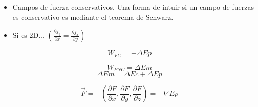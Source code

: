     \begin{itemize}
        \item Campos de fuerza conservativos. Una forma de intuir si un campo de fuerzas es conservativo es mediante el teorema de Schwarz. 
        \item Si es 2D... $\left( \frac{\partial f_y}{\partial x} = \frac{\partial f_x}{\partial y} \right)$
    \end{itemize}
    \begin{equation}
        W_{FC} = -\Delta Ep
    \end{equation}

    \begin{equation}
        W_{FNC} = \Delta Em
    \end{equation}
    \begin{equation*}
        \Delta Em = \Delta Ec +\Delta Ep
    \end{equation*}
    
    \begin{equation}
        \vec{F} = -\left(\frac{\partial F}{\partial x} , \frac{\partial F}{\partial y} , \frac{\partial F}{\partial z} \right) = -\nabla Ep
    \end{equation}

    \newpage
    
    
    
